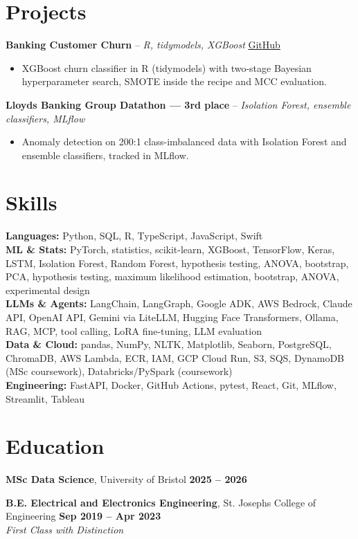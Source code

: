 \documentclass[a4paper,10pt]{article}
\begin{document}
\section{Projects}
\noindent\textbf{Banking Customer Churn} -- \textit{R, tidymodels, XGBoost} \hfill \href{https://github.com/Thiruvel-AP/Banking-Customer-Churn-Prediction}{GitHub}
\begin{itemize}
  \item XGBoost churn classifier in R (tidymodels) with two-stage Bayesian hyperparameter search, SMOTE inside the recipe and MCC evaluation.
\end{itemize}
\noindent\textbf{Lloyd\textquotesingle{}s Banking Group Datathon — 3rd place} -- \textit{Isolation Forest, ensemble classifiers, MLflow} \hfill 
\begin{itemize}
  \item Anomaly detection on 200:1 class-imbalanced data with Isolation Forest and ensemble classifiers, tracked in MLflow.
\end{itemize}

\section{Skills}
\textbf{Languages:} Python, SQL, R, TypeScript, JavaScript, Swift\\
\textbf{ML \& Stats:} PyTorch, statistics, scikit-learn, XGBoost, TensorFlow, Keras, LSTM, Isolation Forest, Random Forest, hypothesis testing, ANOVA, bootstrap, PCA, hypothesis testing, maximum likelihood estimation, bootstrap, ANOVA, experimental design\\
\textbf{LLMs \& Agents:} LangChain, LangGraph, Google ADK, AWS Bedrock, Claude API, OpenAI API, Gemini via LiteLLM, Hugging Face Transformers, Ollama, RAG, MCP, tool calling, LoRA fine-tuning, LLM evaluation\\
\textbf{Data \& Cloud:} pandas, NumPy, NLTK, Matplotlib, Seaborn, PostgreSQL, ChromaDB, AWS Lambda, ECR, IAM, GCP Cloud Run, S3, SQS, DynamoDB (MSc coursework), Databricks/PySpark (coursework)\\
\textbf{Engineering:} FastAPI, Docker, GitHub Actions, pytest, React, Git, MLflow, Streamlit, Tableau

\section{Education}
\textbf{MSc Data Science}, University of Bristol \hfill \textbf{2025 – 2026}\par
\vspace{2pt}
\textbf{B.E. Electrical and Electronics Engineering}, St. Joseph\textquotesingle{}s College of Engineering \hfill \textbf{Sep 2019 – Apr 2023}\\ \textit{First Class with Distinction}\par
\end{document}
